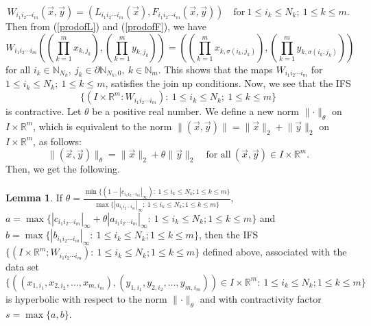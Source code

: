 \documentclass[10pt]{amsart}
\theoremstyle{definition}
\newtheorem{lm}{Lemma}[section]
\newcommand{\myseries}[3]{#1\leq #2\leq #3}
\newcommand{\norm}[2]{\lVert #1 \rVert_#2}
\newcommand{\prodifs}[1]{#1_{i_1i_2\cdots i_m}}
\newcommand{\prodpoint}[2]{#1_{1,#2_1},#1_{2,#2_2},\ldots,#1_{m,#2_m}}
\begin{document}
	\begin{equation}
		\prodifs{W}(\vec{x},\vec{y})=(\prodifs{L}(\vec{x}),\prodifs{F}(\vec{x},\vec{y}))\quad\mbox{for}~\myseries{1}{i_k}{N_k};~\myseries{1}{k}{m}.
	\end{equation}
	Then from (\ref{prodofL}) and (\ref{prodofF}), we have 
	\begin{equation}
		\prodifs{W}\left(\left(\prod_{k=1}^{m}x_{k,j_k}\right),\left(\prod_{k=1}^{m}y_{k,j_k}\right)\right)=\left(\left(\prod_{k=1}^{m}x_{k,\sigma(i_k,j_k)}\right),\left(\prod_{k=1}^{m}y_{k,\sigma(i_k,j_k)}\right)\right)
	\end{equation}
	for all $i_k\in \mathbb{N}_{N_k},~j_k\in \partial\mathbb{N}_{N_k,0},~ k\in\mathbb{N}_m$. This shows that the maps $\prodifs{W}$ for $\myseries{1}{i_k}{N_k};~\myseries{1}{k}{m}$, satisfies the join up conditions. Now, we see that the IFS
	\begin{equation}\label{noforpdifew}
		\{(I\times\mathbb{R}^m:\prodifs{W}):~\myseries{1}{i_k}{N_k};~\myseries{1}{k}{m}\}
	\end{equation}  is contractive. Let $\theta$ be a positive real number. We define a new norm $\norm{\cdot}{\theta}$ on $I\times\mathbb{R}^m$, which is equivalent to the norm $\lVert(\vec{x},\vec{y})\rVert=\norm{\vec{x}}{2}+\norm{\vec{y}}{2}$ on $I\times\mathbb{R}^m$, as follows:
	$$\norm{(\vec{x},\vec{y})}{\theta}=\norm{\vec{x}}{2}+\theta\norm{\vec{y}}{2}\quad\mbox{for all}~ (\vec{x},\vec{y})\in I\times\mathbb{R}^m.$$
	Then, we get the following.
	\begin{lm}
		If $\theta=\frac{\min\{(1-|\prodifs{c}|_{\infty}):~\myseries{1}{i_k}{N_k};\myseries{1}{k}{m}\}}{\max\{|\prodifs{a}|_{\infty}:~\myseries{1}{i_k}{N_k};\myseries{1}{k}{m}\}}$, $a=\max\{|\prodifs{c}|_{\infty}+\theta|\prodifs{a}|_{\infty}:~\myseries{1}{i_k}{N_k};\myseries{1}{k}{m}\}$ and $b=\max\{|\prodifs{b}|_{\infty}:~\myseries{1}{i_k}{N_k};\myseries{1}{k}{m}\}$, then the IFS $\{(I\times\mathbb{R}^m;\prodifs{W}):~\myseries{1}{i_k}{N_k};\myseries{1}{k}{m}\}$ defined above, associated with the data set $\{((\prodpoint{x}{i}),(\prodpoint{y}{i}))\in I\times\mathbb{R}^m:~\myseries{1}{i_k}{N_k};\myseries{1}{k}{m}\}$ is hyperbolic with respect to the norm $\norm{\cdot}{\theta}$ and with contractivity factor $s=\max\{a,b\}$.
	\end{lm}
\end{document}
